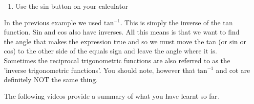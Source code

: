 {\begin{mdframed}[linewidth=4, leftmargin=40, rightmargin=40]
\begin{exercise}
\begin{enumerate}[noitemsep, label=\textbf{Step} \textbf{\arabic*}. ]
{\begin{minipage}{\columnwidth}
    \parbox[t]{48pt}{\raggedleft 
    (14.13)}
    \end{minipage}\vspace{12pt}\par
    }%
      \item  
      \label{m39408*id81284}Use the sin
 button on your calculator\par 
      \label{m39408*id81293}\nopagebreak\noindent{}
      \end{enumerate}
    \end{exercise}
    \end{mdframed}
    }
    \noindent
\par
    \noindent
\label{m39408*eip-200}In the previous example we used \begin{math}{\mathrm{tan}}^{-1}\end{math}. This is simply the inverse of the tan function. Sin and cos also have inverses. All this means is that we want to find the angle that makes the expression true and so we must move the tan (or sin or cos) to the other side of the equals sign and leave the angle where it is. Sometimes the reciprocal trigonometric functions are also referred to as the 'inverse trigonometric functions'. You should note, however that \begin{math}{\mathrm{tan}}^{-1}\end{math} and \begin{math}\mathrm{cot}\end{math} are definitely NOT the same thing. \par \label{m39408*eip-358}The following videos provide a summary of what you have learnt so far.
